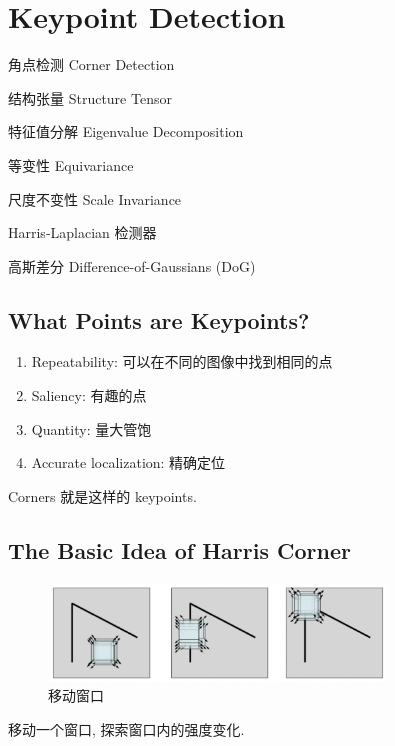\chapter{Keypoint Detection}

\begin{introduction}[Keywords]
    \item 角点检测 Corner Detection
    \item 结构张量 Structure Tensor
    \item 特征值分解 Eigenvalue Decomposition
    \item 等变性 Equivariance
    \item 尺度不变性 Scale Invariance
    \item Harris-Laplacian 检测器
    \item 高斯差分 Difference-of-Gaussians (DoG)
\end{introduction}

\section{What Points are Keypoints?}

\begin{enumerate}
    \item Repeatability: 可以在不同的图像中找到相同的点
    \item Saliency: 有趣的点
    \item Quantity: 量大管饱
    \item Accurate localization: 精确定位
\end{enumerate}
Corners 就是这样的 keypoints.

\section{The Basic Idea of Harris Corner}

\begin{figure}[htbp]
    \centering
    \includegraphics[width=0.8\textwidth]{figures/window_moving.png}
    \caption{移动窗口}
\end{figure}

移动一个窗口, 探索窗口内的强度变化.

